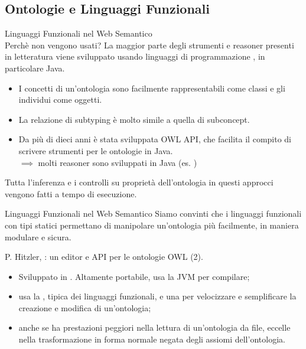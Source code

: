 \subsection{Ontologie e Linguaggi Funzionali}
\begin{frame}{Linguaggi Funzionali nel Web Semantico\\{\large Perchè non vengono usati?}}
	La maggior parte degli strumenti e reasoner presenti in letteratura viene sviluppato usando linguaggi di programmazione , in particolare Java.
	\begin{itemize}
		\item I concetti di un'ontologia sono facilmente rappresentabili come classi e gli individui come oggetti.
		\item La relazione di subtyping è molto simile a quella di subconcept.
		\item Da più di dieci anni è stata sviluppata OWL API, che facilita il compito di scrivere strumenti per le ontologie in Java.\\
		$\implies$ molti reasoner sono sviluppati in Java (es. )		
	\end{itemize}
	
	Tutta l'inferenza e i controlli su proprietà dell'ontologia in questi approcci vengono fatti a tempo di esecuzione.
\end{frame}

\begin{frame}{Linguaggi Funzionali nel Web Semantico}
	Siamo convinti che i linguaggi funzionali con tipi statici permettano di manipolare un'ontologia più facilmente, in maniera modulare e sicura.
	
	P. Hitzler, : un editor e API per le ontologie OWL (2).
	\begin{itemize}
		\item Sviluppato in . Altamente portabile, usa la JVM per compilare;
		\item usa la , tipica dei linguaggi funzionali, e una  per velocizzare e semplificare la creazione e modifica di un'ontologia;\\
		\item anche se ha prestazioni peggiori nella lettura di un'ontologia da file, eccelle nella trasformazione in forma normale negata degli assiomi dell'ontologia. %
	\end{itemize}
	
\end{frame}
